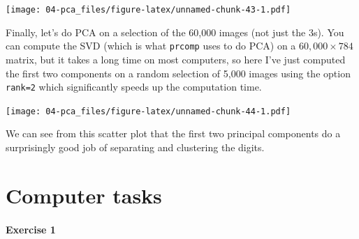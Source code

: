 \documentclass[
]{book}
\newenvironment{Shaded}{\begin{snugshade}}{\end{snugshade}}
\newcommand{\AttributeTok}[1]{\textcolor[rgb]{0.13,0.29,0.53}{#1}}
\newcommand{\CommentTok}[1]{\textcolor[rgb]{0.56,0.35,0.01}{\textit{#1}}}
\newcommand{\DecValTok}[1]{\textcolor[rgb]{0.00,0.00,0.81}{#1}}
\newcommand{\FunctionTok}[1]{\textcolor[rgb]{0.13,0.29,0.53}{\textbf{#1}}}
\newcommand{\NormalTok}[1]{#1}
\newcommand{\OtherTok}[1]{\textcolor[rgb]{0.56,0.35,0.01}{#1}}
\newcommand{\SpecialCharTok}[1]{\textcolor[rgb]{0.81,0.36,0.00}{\textbf{#1}}}
\theoremstyle{definition}
\theoremstyle{definition}
\theoremstyle{definition}
\theoremstyle{definition}
\theoremstyle{remark}
\begin{document}
\texttt{[image: 04-pca\_files/figure-latex/unnamed-chunk-43-1.pdf]}

Finally, let's do PCA on a selection of the 60,000 images (not just the 3s). You can compute the SVD (which is what \texttt{prcomp} uses to do PCA) on a \(60,000 \times 784\) matrix, but it takes a long time on most computers, so here I've just computed the first two components on a random selection of 5,000 images using the option \texttt{rank=2} which significantly speeds up the computation time.

\begin{Shaded}
\end{Shaded}

\texttt{[image: 04-pca\_files/figure-latex/unnamed-chunk-44-1.pdf]}

We can see from this scatter plot that the first two principal components do a surprisingly good job of separating and clustering the digits.

\section{Computer tasks}\label{pca-comptask}

\paragraph*{Exercise 1}\label{exercise-1}
\end{document}
